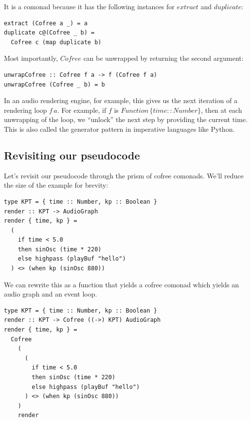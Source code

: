\documentclass{article}
\begin{document}
It is a comonad because it has the following instances for $extract$ and $duplicate$:

\lstset{language=Haskell, style=psstyle}
\begin{lstlisting}
extract (Cofree a _) = a
duplicate c@(Cofree _ b) =
  Cofree c (map duplicate b)
\end{lstlisting}

Most importantly, $Cofree$ can be unwrapped by returning the second argument:

\lstset{language=Haskell, style=psstyle}
\begin{lstlisting}
unwrapCofree :: Cofree f a -> f (Cofree f a)
unwrapCofree (Cofree _ b) = b
\end{lstlisting}

In an audio rendering engine, for example, this gives us the next iteration of a rendering loop $f\,a$. For example, if $f$ is $Function\,\{ time :: Number \}$, then at each unwrapping of the loop, we ``unlock'' the next step by providing the current time. This is also called the generator pattern in imperative languages like Python.

\subsection{Revisiting our pseudocode}

Let's revisit our pseudocode through the prism of cofree comonads. We'll reduce the size of the example for brevity:

\lstset{language=Haskell, style=psstyle}
\begin{lstlisting}
type KPT = { time :: Number, kp :: Boolean }
render :: KPT -> AudioGraph
render { time, kp } =
  (
    if time < 5.0
    then sinOsc (time * 220)
    else highpass (playBuf "hello")
  ) <> (when kp (sinOsc 880))
\end{lstlisting}

We can rewrite this as a function that yields a cofree comonad which yields an audio graph and an event loop.

\lstset{language=Haskell, style=psstyle}
\begin{lstlisting}
type KPT = { time :: Number, kp :: Boolean }
render :: KPT -> Cofree ((->) KPT) AudioGraph
render { time, kp } =
  Cofree
    (
      (
        if time < 5.0
        then sinOsc (time * 220)
        else highpass (playBuf "hello")
      ) <> (when kp (sinOsc 880))
    )
    render
\end{lstlisting}
\end{document}
